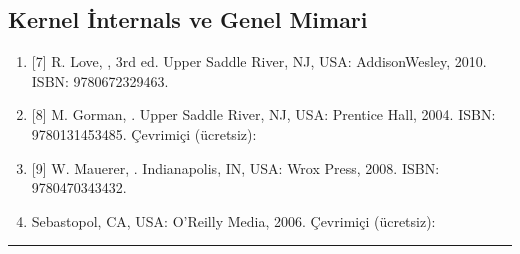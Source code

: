 \documentclass[a4paper,10pt,turkish]{sphinxmanual}
\begin{document}
\subsection{Kernel İnternals ve Genel Mimari}
\label{\detokenize{introduction:kernel-internals-ve-genel-mimari}}\begin{enumerate}
%
\item {} 
\sphinxAtStartPar
{[}7{]} R. Love, , 3rd ed.
Upper Saddle River, NJ, USA: Addison\sphinxhyphen{}Wesley, 2010.
ISBN: 978\sphinxhyphen{}0\sphinxhyphen{}672\sphinxhyphen{}32946\sphinxhyphen{}3.

\item {} 
\sphinxAtStartPar
{[}8{]} M. Gorman, .
Upper Saddle River, NJ, USA: Prentice Hall, 2004.
ISBN: 978\sphinxhyphen{}0\sphinxhyphen{}131\sphinxhyphen{}45348\sphinxhyphen{}5.
Çevrimiçi (ücretsiz): 

\item {} 
\sphinxAtStartPar
{[}9{]} W. Mauerer, .
Indianapolis, IN, USA: Wrox Press, 2008.
ISBN: 978\sphinxhyphen{}0\sphinxhyphen{}470\sphinxhyphen{}34343\sphinxhyphen{}2.

\item {} \begin{description}
\sphinxAtStartPar
Sebastopol, CA, USA: O’Reilly Media, 2006.
Çevrimiçi (ücretsiz): 

\end{description}

\end{enumerate}


\bigskip\hrule\bigskip
\end{document}
